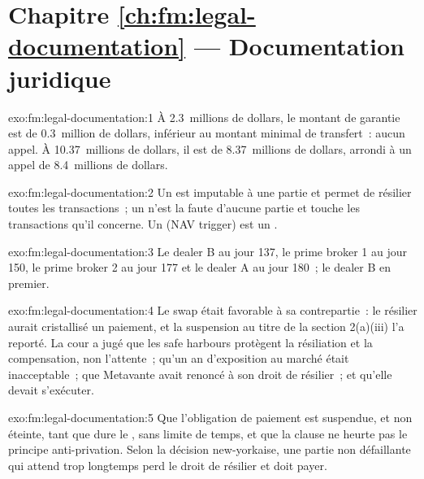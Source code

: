 \section*{Chapitre \ref{ch:fm:legal-documentation} --- Documentation juridique}

\begin{solution}{exo:fm:legal-documentation:1}
À 2.3~millions de dollars, le montant de garantie est de 0.3~million de dollars, inférieur au montant minimal de transfert~: aucun appel. À 10.37~millions de dollars, il est de 8.37~millions de dollars,
arrondi à un appel de 8.4~millions de dollars.
\end{solution}

\begin{solution}{exo:fm:legal-documentation:2}
Un  est imputable à une partie et permet de résilier toutes les transactions~; un  n'est la faute d'aucune partie et touche les
transactions qu'il concerne. Un  (NAV trigger) est un .
\end{solution}

\begin{solution}{exo:fm:legal-documentation:3}
Le dealer B au jour 137, le prime broker 1 au jour 150, le prime broker 2 au jour 177 et le dealer A au jour 180~; le dealer B en premier.
\end{solution}

\begin{solution}{exo:fm:legal-documentation:4}
Le swap était favorable à sa contrepartie~: le résilier aurait cristallisé un paiement, et la suspension au titre de la section 2(a)(iii) l'a reporté.
La cour a jugé que les safe harbours protègent la résiliation et la compensation, non l'attente~; qu'un an d'exposition au marché était inacceptable~; que
Metavante avait renoncé à son droit de résilier~; et qu'elle devait s'exécuter.
\end{solution}

\begin{solution}{exo:fm:legal-documentation:5}
Que l'obligation de paiement est suspendue, et non éteinte, tant que dure le , sans limite de temps, et que la clause
ne heurte pas le principe anti-privation. Selon la décision new-yorkaise, une partie non défaillante qui attend trop longtemps perd le droit de résilier
et doit payer.
\end{solution}

